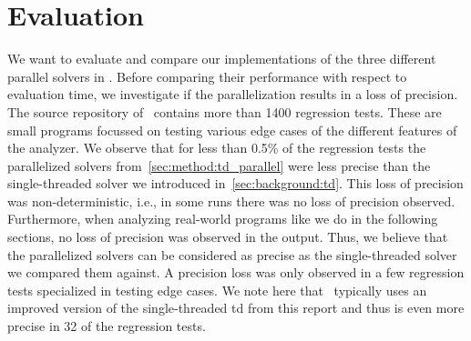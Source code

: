 \section{Evaluation}
\label{sec:eval}
We want to evaluate and compare our implementations of the three different parallel solvers in \gob. Before comparing their performance with respect to evaluation time, we investigate if the parallelization results in a loss of precision.
The source repository of \gob\ contains more than 1400 regression tests. These are small programs focussed on testing various edge cases of the different features of the analyzer. We observe that for less than 0.5\% of the regression tests the parallelized solvers from~\autoref{sec:method:td_parallel} were less precise than the single-threaded solver we introduced in~\autoref{sec:background:td}. This loss of precision was non-deterministic, i.e., in some runs there was no loss of precision observed. Furthermore, when analyzing real-world programs like we do in the following sections, no loss of precision was observed in the output. Thus, we believe that the parallelized solvers can be considered as precise as the single-threaded solver we compared them against. A precision loss was only observed in a few regression tests specialized in testing edge cases. We note here that \gob\ typically uses an improved version of the single-threaded \ac{td} from this report and thus is even more precise in 32 of the regression tests.

